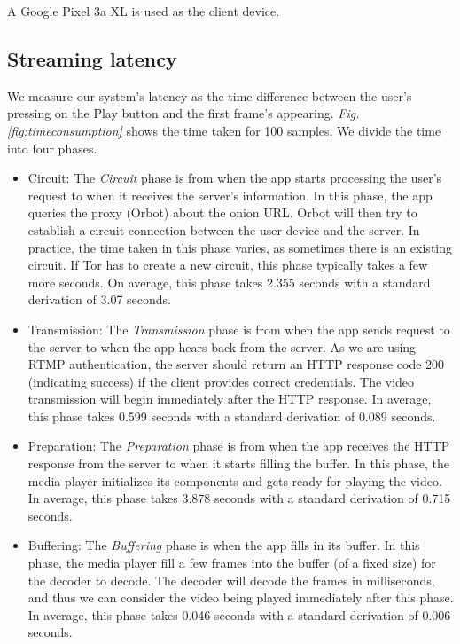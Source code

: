 A Google Pixel 3a XL is used as the client device.

\subsection{Streaming latency}
\label{subsec:streaming_latency}
We measure our system's latency as the time difference between the user’s pressing on the Play button and the first frame’s appearing. \textit{Fig. \ref{fig:timeconsumption}} shows the time taken for 100 samples. We divide the time into four phases.
\begin{itemize}
	\item Circuit: The \textit{Circuit} phase is from when the app starts processing the user’s request to when it receives the server's information. In this phase, the app queries the proxy (Orbot) about the onion URL. Orbot will then try to establish a circuit connection between the user device and the server. In practice, the time taken in this phase varies, as sometimes there is an existing circuit. If Tor has to create a new circuit, this phase typically takes a few more seconds. On average, this phase takes 2.355 seconds with a standard derivation of 3.07 seconds.
	\item Transmission: The \textit{Transmission} phase is from when the app sends request to the server to when the app hears back from the server. As we are using RTMP authentication, the server should return an HTTP response code 200 (indicating success) if the client provides correct credentials. The video transmission will begin immediately after the HTTP response. In average, this phase takes 0.599 seconds with a standard derivation of 0.089 seconds.
	\item Preparation: The \textit{Preparation} phase is from when the app receives the HTTP response from the server to when it starts filling the buffer. In this phase, the media player initializes its components and gets ready for playing the video. In average, this phase takes 3.878 seconds with a standard derivation of 0.715 seconds.
	\item Buffering: The \textit{Buffering} phase is when the app fills in its buffer. In this phase, the media player fill a few frames into the buffer (of a fixed size) for the decoder to decode. The decoder will decode the frames in milliseconds, and thus we can consider the video being played immediately after this phase. In average, this phase takes 0.046 seconds with a standard derivation of 0.006 seconds.
\end{itemize}


